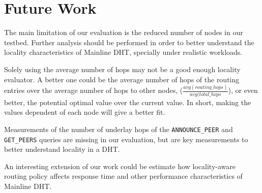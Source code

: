 \documentclass[conference]{IEEEtran}
\begin{document}
\section{Future Work}

The main limitation of our evaluation is the reduced number of nodes in our testbed. Further analysis should be performed in order to better understand the locality characteristics of Mainline DHT, specially under realistic workloads.

Solely using the average number of hops may not be a good enough locality evaluator. A better one could be the average number of hops of the routing entries over the average number of hops to other nodes, ($\frac{avg(routing\_hops)}{avg(total\_hops}$), or even better, the potential optimal value over the current value. In short, making the values dependent of each node will give a better fit.

Measurements of the number of underlay hops of the \texttt{ANNOUNCE\_PEER} and \texttt{GET\_PEERS} queries are missing in our evaluation, but are key measurements to better understand locality in a DHT.

An interesting extension of our work could be estimate how locality-aware routing policy affects response time and other performance characteristics of Mainline DHT.



%
%
\end{document}

